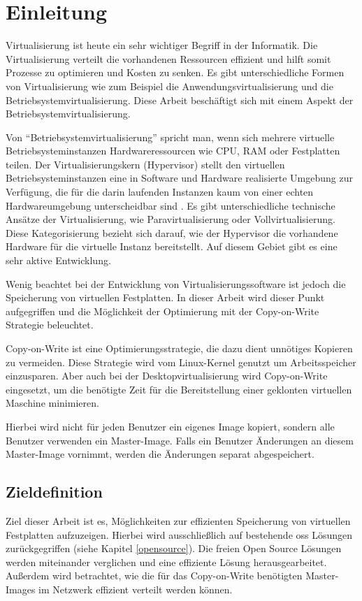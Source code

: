 \chapter{Einleitung}
Virtualisierung ist heute ein sehr wichtiger Begriff in der Informatik. Die Virtualisierung verteilt die vorhandenen Ressourcen effizient und hilft somit Prozesse zu optimieren und Kosten zu senken. Es gibt unterschiedliche Formen von Virtualisierung wie zum Beispiel die Anwendungsvirtualisierung und die Betriebsystemvirtualisierung. Diese Arbeit beschäftigt sich mit einem Aspekt der Betriebsystemvirtualisierung.

Von ``Betriebsystemvirtualisierung'' spricht man, wenn sich mehrere virtuelle Betriebsysteminstanzen Hardwareressourcen wie CPU, RAM oder Festplatten teilen. Der Virtualisierungskern (Hypervisor) stellt den virtuellen Betriebsysteminstanzen eine in Software und Hardware realisierte Umgebung zur Verfügung, die für die darin laufenden Instanzen kaum von einer echten Hardwareumgebung unterscheidbar sind  \cite{andrep} \cite{baun}. Es gibt unterschiedliche technische Ansätze der Virtualisierung, wie Paravirtualisierung oder Vollvirtualisierung. Diese Kategorisierung bezieht sich darauf, wie der Hypervisor die vorhandene Hardware für die virtuelle Instanz bereitstellt. Auf diesem Gebiet gibt es eine sehr aktive Entwicklung.

Wenig beachtet bei der Entwicklung von Virtualisierungssoftware ist jedoch die Speicherung von virtuellen Festplatten. In dieser Arbeit wird dieser Punkt aufgegriffen und die Möglichkeit der Optimierung mit der Copy-on-Write Strategie beleuchtet.

Copy-on-Write ist eine Optimierungsstrategie, die dazu dient unnötiges Kopieren zu vermeiden. Diese Strategie wird vom Linux-Kernel genutzt um Arbeitsspeicher einzusparen. Aber auch bei der Desktopvirtualisierung wird Copy-on-Write eingesetzt, um die benötigte Zeit für die Bereitstellung einer geklonten virtuellen Maschine minimieren.
\begin{comment}Zusätzlich werden die Systemressourcen (Storage, IO, CPU) des physikalischen Virtualisierungsservers geschont.\end{comment}
Hierbei wird nicht für jeden Benutzer ein eigenes Image kopiert, sondern alle Benutzer verwenden ein Master-Image. Falls ein Benutzer Änderungen an diesem Master-Image vornimmt, werden die Änderungen separat abgespeichert. 

\section{Zieldefinition}
Ziel dieser Arbeit ist es, Möglichkeiten zur effizienten Speicherung von virtuellen Festplatten aufzuzeigen. Hierbei wird ausschließlich auf bestehende \gls{oss} Lösungen zurückgegriffen (siehe Kapitel \ref{opensource}). Die freien Open Source Lösungen werden miteinander verglichen und eine effiziente Lösung herausgearbeitet. Außerdem wird betrachtet, wie die für das Copy-on-Write benötigten Master-Images im Netzwerk effizient verteilt werden können.  


